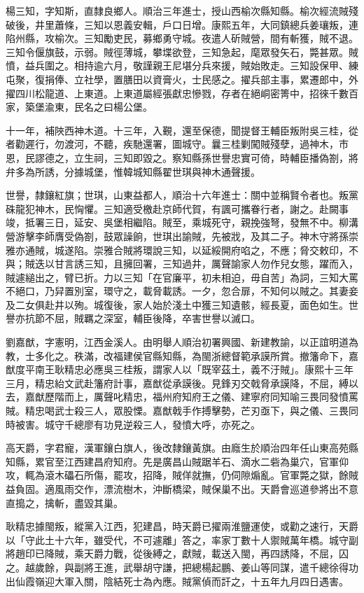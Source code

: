 \begin{pinyinscope}
楊三知，字知斯，直隸良鄉人。順治三年進士，授山西榆次縣知縣。榆次經流賊殘破後，井里蕭條，三知以恩義安輯，戶口日增。康熙五年，大同鎮總兵姜瓖叛，連陷州縣，攻榆次。三知勵吏民，募鄉勇守城。夜遣人斫賊營，間有斬獲，賊不退。三知令偃旗鼓，示弱。賊徑薄城，攀堞欲登，三知急起，麾眾發矢石，斃甚眾。賊憤，益兵圍之。相持逾六月，敬謹親王尼堪分兵來援，賊始敗走。三知設保甲、練屯聚，復捐俸、立社學，置膳田以資膏火，士民感之。擢兵部主事，累遷郎中，外擢四川松龍道、上東道。上東道屬經張獻忠慘戮，存者在絕峒密箐中，招徠千數百家，築堡渝東，民名之曰楊公堡。

十一年，補陜西神木道。十三年，入覲，還至保德，聞提督王輔臣叛附吳三桂，從者勸遲行，勿渡河，不聽，疾馳還署，圖城守。曩三桂剿闖賊殘孽，過神木，市恩，民謬德之，立生祠，三知即毀之。察知縣孫世譽忠實可倚，時輔臣播偽劄，將弁多為所誘，分據城堡，惟韓城知縣翟世琪與神木通聲援。

世譽，隸鑲紅旗；世琪，山東益都人，順治十六年進士：關中並稱賢令者也。叛黨硃龍犯神木，民恟懼。三知適受檄赴京師代賀，有諷可攜眷行者，謝之。赴闕事竣，抵署三日，延安、吳堡相繼陷。賊至，乘城死守，親挽強弩，發無不中。柳溝營游擊李師膺受偽劄，鼓眾譟餉，世琪出諭賊，先被戕，及其二子。神木守將孫崇雅亦通賊，城遂陷。崇雅合賊將環說三知，以延綏開府啗之，不應；脅交敕印，不與；賊迭以甘言誘三知，且擁回署，三知過井，厲聲諭家人勿作兒女態，躍而入，賊遽縋出之，臂已折。力以三知「在官廉平，初未相迫，毋自苦」為詞，三知大罵不絕口，乃舁置別室，環守之，載脅載誘。一夕，忽合扉，不知何以賊之。其妻妾及二女俱赴井以殉。城復後，家人始於淺土中獲三知遺骸，經長夏，面色如生。世譽亦抗節不屈，賊羈之深室，輔臣後降，卒害世譽以滅口。

劉嘉猷，字憲明，江西金溪人。由明舉人順治初署興國、新建教諭，以正誼明道為教，士多化之。秩滿，改福建侯官縣知縣，為閩浙總督範承謨所賞。撤籓命下，嘉猷度平南王耿精忠必應吳三桂叛，謂家人以「既宰茲土，義不汙賊」。康熙十三年三月，精忠紿文武赴籓府計事，嘉猷從承謨後。見鋒刃交戟脅承謨降，不屈，縛以去，嘉猷歷階而上，厲聲叱精忠，福州府知府王之儀、建寧府同知喻三畏同發憤罵賊。精忠喝武士殺三人，眾股慄。嘉猷戟手作搏擊勢，芒刃亟下，與之儀、三畏同時被害。城守千總廖有功見逆殺三人，發憤大呼，亦死之。

高天爵，字君寵，漢軍鑲白旗人，後改隸鑲黃旗。由廕生於順治四年任山東高苑縣知縣，累官至江西建昌府知府。先是廣昌山賊踞羊石、滴水二砦為巢穴，官軍仰攻，輒為滾木礧石所傷，罷攻，招降，賊佯就撫，仍伺隙煽亂。官軍斃之獄，餘賊益負固。適風雨交作，漂流樹木，沖斷橋梁，賊保巢不出。天爵會巡道參將出不意直搗之，擒斬，盡毀其巢。

耿精忠據閩叛，縱黨入江西，犯建昌，時天爵已擢兩淮鹽運使，或勸之速行，天爵以「守此土十六年，雖受代，不可遽離」答之，率家丁數十人禦賊萬年橋。城守副將趙印已降賊，乘天爵力戰，從後縛之，獻賊，載送入閩，再四誘降，不屈，囚之。越歲餘，與副將王進，武舉胡守謙，把總楊起鵬、姜山等同謀，遣千總徐得功出仙霞嶺迎大軍入關，陰結死士為內應。賊黨偵而訐之，十五年九月四日遇害。


\end{pinyinscope}
